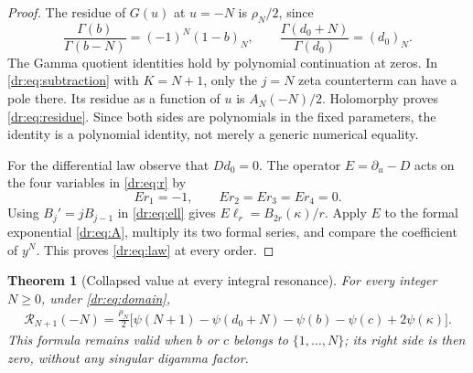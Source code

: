 \documentclass[11pt,letterpaper]{article}
\numberwithin{equation}{section}
\newtheorem{theorem}{Theorem}[section]
\theoremstyle{definition}
\theoremstyle{remark}
\newcommand{\Rcal}{\mathcal R}
\begin{document}
\begin{proof}
The residue of $G(u)$ at $u=-N$ is $\rho_N/2$, since
\[
 \frac{\Gamma(b)}{\Gamma(b-N)}=(-1)^N(1-b)_N,
 \qquad \frac{\Gamma(d_0+N)}{\Gamma(d_0)}=(d_0)_N.
\]
The Gamma quotient identities hold by polynomial continuation at zeros.
In \eqref{dr:eq:subtraction} with $K=N+1$, only the $j=N$ zeta
counterterm can have a pole there. Its residue as a function of $u$ is
$A_N(-N)/2$. Holomorphy proves \eqref{dr:eq:residue}. Since both sides
are polynomials in the fixed parameters, the identity is a polynomial
identity, not merely a generic numerical equality.

For the differential law observe that $D d_0=0$. The operator
$E=\partial_u-D$ acts on the four variables in \eqref{dr:eq:r} by
\[
 Er_1=-1,\qquad Er_2=Er_3=Er_4=0.
\]
Using $B_j'=jB_{j-1}$ in \eqref{dr:eq:ell} gives
$E\ell_r=B_{2r}(\kappa)/r$. Apply $E$ to the formal exponential
\eqref{dr:eq:A}, multiply its two formal series, and compare the
coefficient of $y^N$. This proves \eqref{dr:eq:law} at every order.
\end{proof}

\begin{theorem}[Collapsed value at every integral resonance]
\label{dr:thm:collapse}
For every integer $N\geq0$, under \eqref{dr:eq:domain},
\begin{align}
 \Rcal_{N+1}(-N)=\frac{\rho_N}{2}
 \bigl[\psi(N+1)-\psi(d_0+N)-\psi(b)-\psi(c)
                  +2\psi(\kappa)\bigr].
 \label{dr:eq:collapse}
\end{align}
This formula remains valid when $b$ or $c$ belongs to $\{1,\ldots,N\}$;
its right side is then zero, without any singular digamma factor.
\end{theorem}
\end{document}
